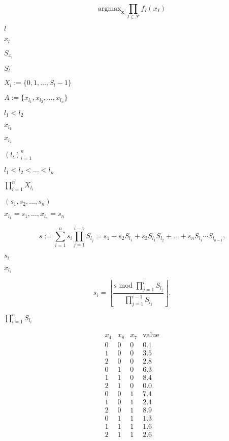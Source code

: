 \documentclass{article}
\begin{document}
\[ \mathrm{argmax}_{\mathbf{x}}\,\prod_{I\in\mathcal{F}} f_I(x_I) \]
\pagebreak

$l$
\pagebreak

$x_l$
\pagebreak

$S_{x_l}$
\pagebreak

$S_l$
\pagebreak

$X_l := \{0,1,\dots,S_l-1\}$
\pagebreak

$A := \{x_{l_1},x_{l_2},\dots,x_{l_n}\}$
\pagebreak

$l_1 < l_2$
\pagebreak

$x_{l_1}$
\pagebreak

$x_{l_2}$
\pagebreak

$(l_i)_{i=1}^n$
\pagebreak

$l_1 < l_2 < \dots < l_n$
\pagebreak

$ \prod_{i=1}^n X_{l_i}$
\pagebreak

$(s_1,s_2,\dots,s_n)$
\pagebreak

$x_{l_1} = s_1, \dots, x_{l_n} = s_n$
\pagebreak

\[
  s := \sum_{i=1}^n s_i \prod_{j=1}^{i-1} S_{l_j} 
     = s_1 + s_2 S_{l_1} + s_3 S_{l_1} S_{l_2} + \dots + s_n S_{l_1} \cdots S_{l_{n-1}}.
\]
\pagebreak

$s_i$
\pagebreak

$x_{l_i}$
\pagebreak

\[
  s_i = \left\lfloor\frac{s \mbox { mod } \prod_{j=1}^i S_{l_j}}{\prod_{j=1}^{i-1} S_{l_j}}\right\rfloor.
\]
\pagebreak

$\prod_{i=1}^n S_{l_i}$
\pagebreak

\[
\begin{array}{ccc|c}
x_4 & x_8 & x_7 & \mbox{value}\\
\hline
 0 & 0 & 0  &  0.1\\
 1 & 0 & 0  &  3.5\\
 2 & 0 & 0  &  2.8\\
 0 & 1 & 0  &  6.3\\
 1 & 1 & 0  &  8.4\\
 2 & 1 & 0  &  0.0\\
 0 & 0 & 1  &  7.4\\
 1 & 0 & 1  &  2.4\\
 2 & 0 & 1  &  8.9\\
 0 & 1 & 1  &  1.3\\
 1 & 1 & 1  &  1.6\\
 2 & 1 & 1  &  2.6
\end{array}
\]
\pagebreak
\end{document}

